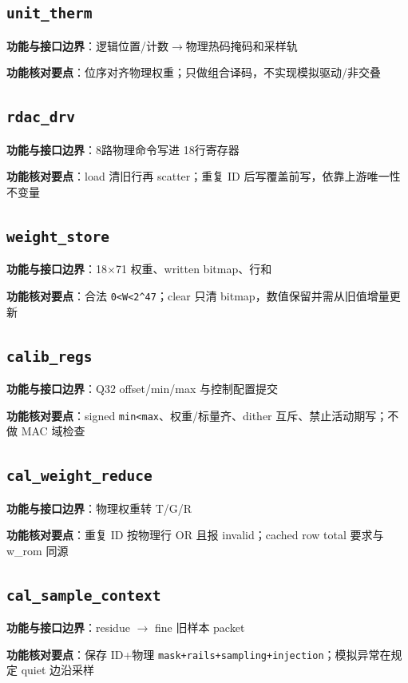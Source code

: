 \documentclass[UTF8,fontset=fandol,10pt,a4paper,openany]{ctexrep}
\newcommand{\code}[1]{\nolinkurl{#1}}
\begin{document}
\subsection*{\code{unit_therm}}
\noindent\textbf{功能与接口边界}：逻辑位置/计数\ensuremath{\rightarrow}物理热码掩码和采样轨\par
\noindent\textbf{功能核对要点}：位序对齐物理权重；只做组合译码，不实现模拟驱动/非交叠\par
\subsection*{\code{rdac_drv}}
\noindent\textbf{功能与接口边界}：8路物理命令写进 18行寄存器\par
\noindent\textbf{功能核对要点}：load 清旧行再 scatter；重复 ID 后写覆盖前写，依靠上游唯一性不变量\par
\subsection*{\code{weight_store}}
\noindent\textbf{功能与接口边界}：18\ensuremath{\times}71 权重、written bitmap、行和\par
\noindent\textbf{功能核对要点}：合法 \code{0<W<2^47}；clear 只清 bitmap，数值保留并需从旧值增量更新\par
\subsection*{\code{calib_regs}}
\noindent\textbf{功能与接口边界}：Q32 offset/min/max 与控制配置提交\par
\noindent\textbf{功能核对要点}：signed \code{min<max}、权重/标量齐、dither 互斥、禁止活动期写；不做 MAC 域检查\par
\subsection*{\code{cal_weight_reduce}}
\noindent\textbf{功能与接口边界}：物理权重转 T/G/R\par
\noindent\textbf{功能核对要点}：重复 ID 按物理行 OR 且报 invalid；cached row total 要求与 w\_rom 同源\par
\subsection*{\code{cal_sample_context}}
\noindent\textbf{功能与接口边界}：residue \ensuremath{\rightarrow} fine 旧样本 packet\par
\noindent\textbf{功能核对要点}：保存 ID+物理 \code{mask+rails+sampling+injection}；模拟异常在规定 quiet 边沿采样\par
\end{document}
